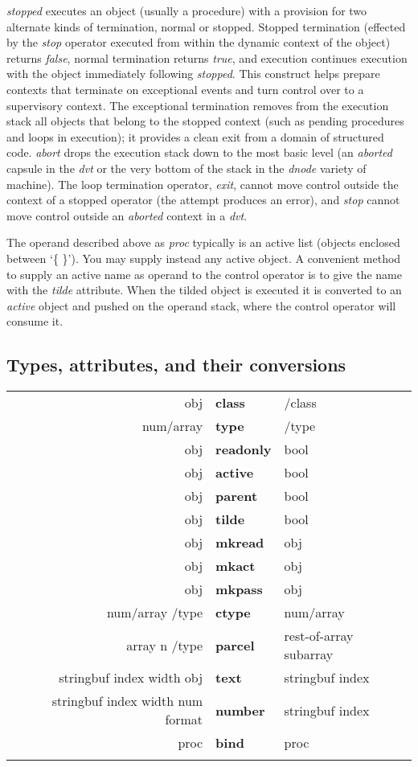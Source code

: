 \emph{stopped} executes an object (usually a procedure) with a provision for two alternate kinds of termination, normal or stopped. Stopped termination  (effected  by  the \emph{stop} operator  executed from  within  the dynamic context of the object) returns \emph{false}, normal termination returns \emph{true}, and execution continues execution with the object immediately following \emph{stopped}. This construct helps  prepare  contexts that terminate on  exceptional events and turn control over to a supervisory context. The exceptional termination removes from the execution stack all objects that belong to the stopped context (such as pending procedures and loops in execution); it provides a clean exit from a domain of structured code. \emph{abort} drops the execution stack down to the most basic level (an \emph{aborted} capsule in the \emph{dvt} or the very bottom of the stack in the \emph{dnode} variety of machine). The loop termination operator, \emph{exit}, cannot move control outside the context of a stopped operator (the attempt produces an error), and \emph{stop} cannot move control outside an \emph{aborted} context in a \emph{dvt}.

The operand described above as \emph{proc} typically is an active list (objects enclosed between `\{ \}'). You may supply instead any active object. A convenient method to supply an active name as operand to the control operator is to give the name with the \emph{tilde} attribute. When the tilded object is executed it is converted to an \emph{active} object and pushed on the operand stack, where the control operator will consume it.


\subsection{Types, attributes, and their conversions}

\begin{tabular}{>{\sffamily}r>{\sffamily\bfseries}l>{\sffamily}l}
obj & class & /class\\
num/array & type & /type\\
obj & readonly & bool\\
obj & active & bool\\
obj & parent & bool\\
obj & tilde & bool\\
obj & mkread & obj\\
obj & mkact & obj\\
obj & mkpass & obj\\
num/array /type & ctype & num/array\\
array n /type & parcel & rest-of-array subarray\\
stringbuf index width obj & text & stringbuf index\\
stringbuf index width num format & number & stringbuf index\\
proc & bind & proc\\\\
\end{tabular}

